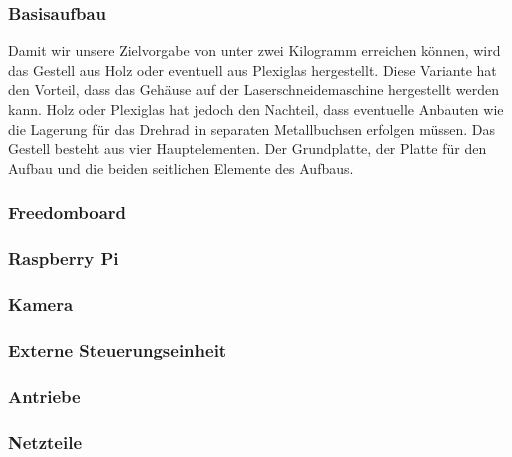 \subsubsection{Basisaufbau}
Damit wir unsere Zielvorgabe von unter zwei Kilogramm erreichen können, wird das Gestell aus Holz oder eventuell aus Plexiglas hergestellt. Diese Variante hat den Vorteil, dass das Gehäuse auf der Laserschneidemaschine hergestellt werden kann. Holz oder Plexiglas hat jedoch den Nachteil, dass eventuelle Anbauten wie die Lagerung für das Drehrad in separaten Metallbuchsen erfolgen müssen. Das Gestell besteht aus vier Hauptelementen. Der Grundplatte, der Platte für den Aufbau und die beiden seitlichen Elemente des Aufbaus.

\subsubsection{Freedomboard}


\subsubsection{Raspberry Pi}


\subsubsection{Kamera}
\label{subsub:kamera}


\subsubsection{Externe Steuerungseinheit}


\subsubsection{Antriebe}


\subsubsection{Netzteile}

